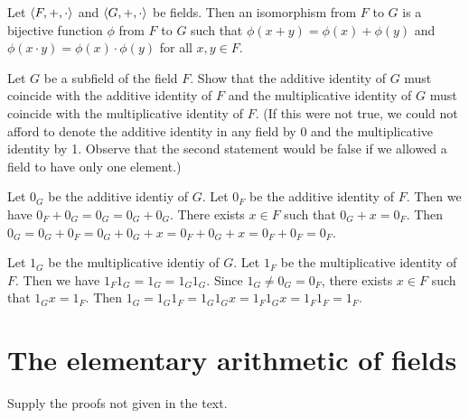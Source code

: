 \begin{solution}
Let $\left\langle F,+,\cdot\right\rangle$ and $\left\langle G,+,\cdot\right\rangle$ be fields.
Then an isomorphism from $F$ to $G$ is a bijective function $\phi$ from $F$ to $G$ such that
$\phi(x+y)=\phi(x) + \phi(y)$ and $\phi(x\cdot y)=\phi(x)\cdot\phi(y)$ for all $x,y\in F$.
\end{solution}

\begin{exercise}
Let $G$ be a subfield of the field $F$. Show that the additive identity of $G$ must coincide
with the additive identity of $F$ and the multiplicative identity of $G$ must coincide with
the multiplicative identity of $F$. (If this were not true, we could not afford to denote the
additive identity in any field by 0 and the multiplicative identity by 1. Observe that the
second statement would be false if we allowed a field to have only one element.)
\end{exercise}

\begin{solution}
Let $0_G$ be the additive identiy of $G$. Let $0_F$ be the additive identity of $F$.
Then we have $0_F+0_G=0_G=0_G+0_G$. There exists $x\in F$ such that $0_G+x=0_F$.
Then $0_G=0_G+0_F=0_G+0_G+x=0_F+0_G+x=0_F+0_F=0_F$.

Let $1_G$ be the multiplicative identiy of $G$. Let $1_F$ be the multiplicative identity of $F$.
Then we have $1_F1_G=1_G=1_G1_G$. Since $1_G\neq 0_G=0_F$, there exists $x\in F$ such that $1_Gx=1_F$.
Then $1_G=1_G1_F=1_G1_Gx=1_F1_Gx=1_F1_F=1_F$.
\end{solution}

\section{The elementary arithmetic of fields}
\begin{exercise}
Supply the proofs not given in the text.
\end{exercise}

